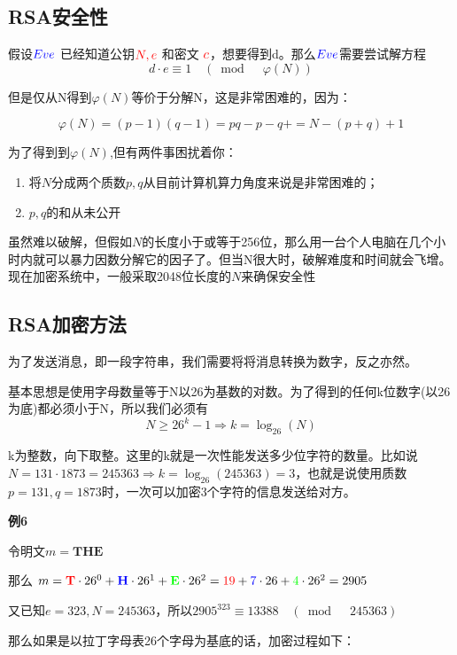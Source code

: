 \documentclass{article}
\begin{document}
\subsection{RSA安全性}

假设${\color{blue}Eve}$ 已经知道公钥${\color{red}N,e}$ 和密文 ${\color{red}c}$，想要得到d。那么${\color{blue}Eve}$需要尝试解方程
$$d \cdot e \equiv 1 \quad (\bmod \quad \varphi(N))$$

但是仅从N得到$\varphi(N)$等价于分解N，这是非常困难的，因为：


$$\varphi(N)  = (p-1)(q-1)=pq - p -q + = N -(p+q)+1$$

为了得到到$\varphi(N)$,但有两件事困扰着你：
\begin{enumerate}
\item 将$N$分成两个质数$p,q$从目前计算机算力角度来说是非常困难的；
\item $p,q$的和从未公开
\end{enumerate}

虽然难以破解，但假如${\displaystyle N}$的长度小于或等于256位，那么用一台个人电脑在几个小时内就可以暴力因数分解它的因子了。但当N很大时，破解难度和时间就会飞增。现在加密系统中，一般采取2048位长度的${\displaystyle N}$来确保安全性

\subsection{RSA加密方法}

为了发送消息，即一段字符串，我们需要将将消息转换为数字，反之亦然。

基本思想是使用字母数量等于N以26为基数的对数。为了得到的任何k位数字(以26为底)都必须小于N，所以我们必须有
$$N \ge 26^k - 1 \Rightarrow k = \log_26(N)$$

k为整数，向下取整。这里的k就是一次性能发送多少位字符的数量。比如说$N =131 \cdot 1873 = 245363 \Rightarrow k = \log_26(245363) = 3$，也就是说使用质数$p=131,q=1873$时，一次可以加密3个字符的信息发送给对方。

\textbf{例6}

令明文$m = \textbf{THE}$

那么 $m = {\color{red}\textbf{T}} \cdot 26^0 + {\color{blue}\textbf{H}} \cdot 26^1 +  {\color{green}\textbf{E}} \cdot 26^2 = {\color{red}19} + {\color{blue}7} \cdot 26 + {\color{green}4} \cdot 26^2 = 2905$

又已知$e = 323,N = 245363$，所以$2905^323 \equiv 13388 \quad (\bmod \quad 245363)$

那么如果是以拉丁字母表26个字母为基底的话，加密过程如下：
\end{document}
